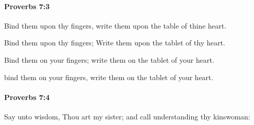 		\paragraph{Proverbs 7:3} %
			\label{PROVERBS-7-3}

			Bind them upon thy fingers, write them upon the table of thine heart.

			\begin{versebox}
					\item[BHS] 
					\item[ASV] Bind them upon thy fingers; Write them upon the tablet of thy heart.
					\item[NIV] Bind them on your fingers; write them on the tablet of your heart.
					\item[NRSV] bind them on your fingers, write them on the tablet of your heart.
			\end{versebox}

		\paragraph{Proverbs 7:4} %
			\label{PROVERBS-7-4}

			Say unto wisdom, Thou art my sister; and call understanding thy kinswoman:

